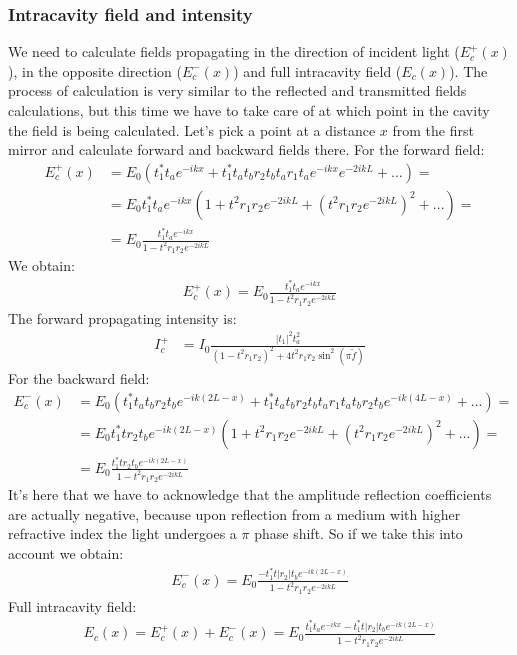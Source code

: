 \documentclass{article}
\numberwithin{equation}{section}
\begin{document}
\subsubsection{Intracavity field and intensity}
We need to calculate fields propagating in the direction of incident light ($E_c^+(x)$), in the opposite direction ($E_c^-(x)$) and full intracavity field ($E_c(x)$). The process of calculation is very similar to the reflected and transmitted fields calculations, but this time we have to take care of at which point in the cavity the field is being calculated. Let's pick a point at a distance $x$ from the first mirror and calculate forward and backward fields there. For the forward field:
\begin{align*}
    E_c^+(x) &= E_0 (t_1^* t_a e^{-ikx} + t_1^* t_a t_b r_2 t_b t_a r_1 t_a e^{-ikx} e^{-2ikL} + ...) = \\
    &= E_0 t_1^* t_a e^{-ikx} (1 + t^2 r_1 r_2 e^{-2ikL} + (t^2 r_1 r_2 e^{-2ikL})^2 + ...) = \\
    &= E_0 \frac{t_1^* t_a e^{-ikx}}{1-t^2 r_1 r_2 e^{-2ikL}}
\end{align*}
We obtain:
\begin{align}
    E_c^+(x) = E_0 \frac{t_1^* t_a e^{-ikx}}{1-t^2 r_1 r_2 e^{-2ikL}} \label{eq:E_c_f}
\end{align}
The forward propagating intensity is:
\begin{align}
    I_c^+ &= I_0 \frac{|t_1|^2 t_a^2}{(1-t^2 r_1 r_2)^2 + 4 t^2 r_1 r_2 \sin^2 (\pi \tilde{f})}
\end{align}
For the backward field:
\begin{align*}
    E_c^-(x) &= E_0 (t_1^* t_a t_b r_2 t_b e^{-ik(2L-x)} + t_1^* t_a t_b r_2 t_b t_a r_1 t_a t_b r_2 t_b e^{-ik(4L-x)} + ...) = \\
    &= E_0 t_1^* t r_2 t_b e^{-ik(2L-x)} (1 + t^2 r_1 r_2 e^{-2ikL} + (t^2 r_1 r_2 e^{-2ikL})^2 + ...) = \\
    &= E_0 \frac{t_1^* t r_2 t_b e^{-ik(2L-x)}}{1-t^2 r_1 r_2 e^{-2ikL}}
\end{align*}
It's here that we have to acknowledge that the amplitude reflection coefficients are actually negative, because upon reflection from a medium with higher refractive index the light undergoes a $\pi$ phase shift. So if we take this into account we obtain:
\begin{align}
    E_c^-(x) = E_0 \frac{-t_1^* t |r_2| t_b e^{-ik(2L-x)}}{1-t^2 r_1 r_2 e^{-2ikL}}
\end{align}
Full intracavity field:
\begin{align*}
  E_c(x) = E_c^+(x) + E_c^-(x) = E_0 \frac{t_1^* t_a e^{-ikx} - t_1^* t |r_2| t_b e^{-ik(2L-x)}}{1-t^2 r_1 r_2 e^{-2ikL}}
\end{align*}
\end{document}
